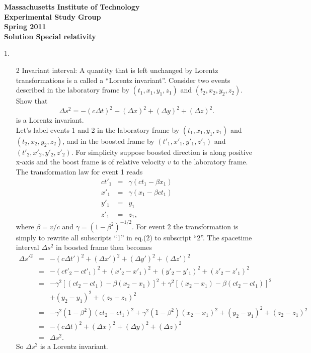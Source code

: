 \setlength{\unitlength}{1.cm}
\doublerulesep -1pt 
\textwidth=6.5in 
\textheight=9in
\hoffset=-1cm 
\voffset=-1in 
\pagestyle{empty}


\begin{center}
{\bf\sc Massachusetts Institute of Technology}\\
{\bf\sc Experimental Study Group}\\
{\bf{} Spring 2011}\\
\bigskip
{\bf\sc Solution Special relativity}
\end{center}

1.

\newpage

\begin{enumerate}

\item[2] Invariant interval: A quantity that is left unchanged by Lorentz
transformations is a called a ``Lorentz invariant''. Consider two
events described in the laboratory frame by $(t_1, x_1, y_1, z_1)$ and
$(t_2, x_2, y_2, z_2)$. Show that
\begin{equation}
\Delta s^2=-(c\Delta t)^2+(\Delta x)^2+(\Delta y)^2+(\Delta z)^2.
\end{equation}
is a Lorentz invariant.\\

Let's label events 1 and 2 in the laboratory frame
by $(t_1, x_1, y_1, z_1)$ and $(t_2, x_2, 
y_2, z_2)$, and in the boosted frame by
$(t'_1, x'_1, y'_1, z'_1)$ and $(t'_2, x'_2, 
y'_2, z'_2)$.  For simplicity suppose boosted direction is along
positive x-axis and the boost frame is of relative velocity $v$ to the
laboratory frame.  The
transformation law for event 1 reads
\begin{eqnarray}
ct'_1 &=& \gamma (ct_1-\beta x_1)\nonumber\\
x'_1 &=&  \gamma (x_1-\beta ct_1)\nonumber\\
y'_1 &=& y_1\nonumber\\
z'_1 &=& z_1,
\end{eqnarray}
where $\beta=v/c$ and $\gamma=(1-\beta^2)^{-1/2}$.  For event 2 the
transformation is simply to rewrite all subscripts ``1'' in eq.(2) to
subscript ``2''.  The spacetime interval $\Delta s^2$ in boosted frame
then becomes
\begin{eqnarray}
\Delta s'^2 &=& -(c\Delta t')^2+(\Delta x')^2+(\Delta y')^2+(\Delta
z')^2\nonumber\\
&=&-(ct'_2-ct'_1)^2+(x'_2-x'_1)^2+(y'_2-y'_1)^2+(z'_2-z'_1)^2\nonumber\\
&=&-\gamma^2[(ct_2-ct_1)-\beta(x_2-x_1)]^2+\gamma^2[(x_2-x_1)-\beta
(ct_2-ct_1)]^2\nonumber\\
&&+(y_2-y_1)^2+(z_2-z_1)^2\nonumber\\
&=&-\gamma^2(1-\beta^2)(ct_2-ct_1)^2+\gamma^2(1-\beta^2)(x_2-x_1)^2
+(y_2-y_1)^2+(z_2-z_1)^2\nonumber\\
&=& -(c\Delta t)^2+(\Delta x)^2+(\Delta y)^2+(\Delta z)^2\nonumber\\
&=& \Delta s^2.
\end{eqnarray}
So $\Delta s^2$ is a Lorentz invariant.


\end{enumerate}
